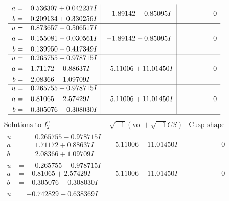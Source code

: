 \documentclass[1p]{elsarticle_modified}
\theoremstyle{definition}
\newcommand{\I}{\sqrt{-1}}
\begin{document}
$$\begin{array}{c|c|c}
\begin{aligned}
a &= \phantom{-}0.536307 + 0.042237 I \\
b &= \phantom{-}0.209134 + 0.330256 I\end{aligned}
 & -1.89142 + 0.85095 I & \phantom{-0.000000 } 0 \\ \hline\begin{aligned}
u &= \phantom{-}0.873657 - 0.506517 I \\
a &= \phantom{-}0.155081 - 0.030561 I \\
b &= \phantom{-}0.139950 - 0.417349 I\end{aligned}
 & -1.89142 + 0.85095 I & \phantom{-0.000000 } 0 \\ \hline\begin{aligned}
u &= \phantom{-}0.265755 + 0.978715 I \\
a &= \phantom{-}1.71172 - 0.88637 I \\
b &= \phantom{-}2.08366 - 1.09709 I\end{aligned}
 & -5.11006 + 11.01450 I & \phantom{-0.000000 } 0 \\ \hline\begin{aligned}
u &= \phantom{-}0.265755 + 0.978715 I \\
a &= -0.81065 - 2.57429 I \\
b &= -0.305076 - 0.308030 I\end{aligned}
 & -5.11006 + 11.01450 I & \phantom{-0.000000 } 0\\
 \hline 
 \end{array}$$\newpage$$\begin{array}{c|c|c}  
\text{Solutions to }I^u_{2}& \I (\text{vol} + \sqrt{-1}CS) & \text{Cusp shape}\\
 \hline 
\begin{aligned}
u &= \phantom{-}0.265755 - 0.978715 I \\
a &= \phantom{-}1.71172 + 0.88637 I \\
b &= \phantom{-}2.08366 + 1.09709 I\end{aligned}
 & -5.11006 - 11.01450 I & \phantom{-0.000000 } 0 \\ \hline\begin{aligned}
u &= \phantom{-}0.265755 - 0.978715 I \\
a &= -0.81065 + 2.57429 I \\
b &= -0.305076 + 0.308030 I\end{aligned}
 & -5.11006 - 11.01450 I & \phantom{-0.000000 } 0 \\ \hline\begin{aligned}
u &= -0.742829 + 0.638369 I \\

\end{aligned}
\end{array}$$
\end{document}
